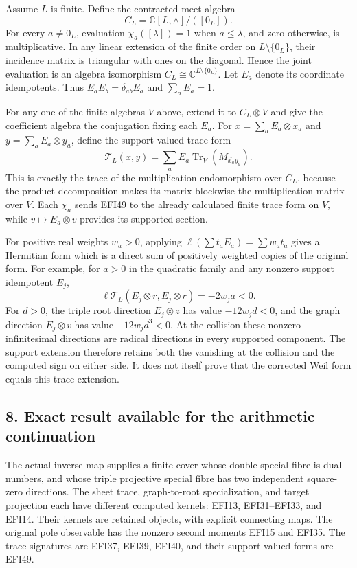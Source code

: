 \documentclass[
  10pt,
  a4paper,
]{article}
\begin{document}
Assume \(L\) is finite. Define the contracted meet algebra \[
C_L=\mathbb C[L,\wedge]/([0_L]).
\tag{EFI48}
\] For every \(a\ne0_L\), evaluation \(\chi_a([\lambda])=1\) when
\(a\le\lambda\), and zero otherwise, is multiplicative. In any linear
extension of the finite order on \(L\setminus\{0_L\}\), their incidence
matrix is triangular with ones on the diagonal. Hence the joint
evaluation is an algebra isomorphism
\(C_L\cong\mathbb C^{L\setminus\{0_L\}}\). Let \(E_a\) denote its
coordinate idempotents. Thus \(E_aE_b=\delta_{ab}E_a\) and
\(\sum_aE_a=1\).

For any one of the finite algebras \(V\) above, extend it to
\(C_L\otimes V\) and give the coefficient algebra the conjugation fixing
each \(E_a\). For \(x=\sum_aE_a\otimes x_a\) and
\(y=\sum_aE_a\otimes y_a\), define the support-valued trace form \[
\mathcal T_L(x,y)=\sum_a E_a
\operatorname{Tr}_V(M_{\overline{x_a}y_a}).
\tag{EFI49}
\] This is exactly the trace of the multiplication endomorphism over
\(C_L\), because the product decomposition makes its matrix blockwise
the multiplication matrix over \(V\). Each \(\chi_a\) sends EFI49 to the
already calculated finite trace form on \(V\), while
\(v\mapsto E_a\otimes v\) provides its supported section.

For positive real weights \(w_a>0\), applying
\(\ell(\sum t_aE_a)=\sum w_at_a\) gives a Hermitian form which is a
direct sum of positively weighted copies of the original form. For
example, for \(a>0\) in the quadratic family and any nonzero support
idempotent \(E_j\), \[
\ell\mathcal T_L(E_j\otimes r,E_j\otimes r)=-2w_ja<0.
\tag{EFI50}
\] For \(d>0\), the triple root direction \(E_j\otimes z\) has value
\(-12w_jd<0\), and the graph direction \(E_j\otimes v\) has value
\(-12w_jd^3<0\). At the collision these nonzero infinitesimal directions
are radical directions in every supported component. The support
extension therefore retains both the vanishing at the collision and the
computed sign on either side. It does not itself prove that the
corrected Weil form equals this trace extension.

\subsection{8. Exact result available for the arithmetic
continuation}\label{exact-result-available-for-the-arithmetic-continuation}

The actual inverse map supplies a finite cover whose double special
fibre is dual numbers, and whose triple projective special fibre has two
independent square-zero directions. The sheet trace, graph-to-root
specialization, and target projection each have different computed
kernels: EFI13, EFI31--EFI33, and EFI14. Their kernels are retained
objects, with explicit connecting maps. The original pole observable has
the nonzero second moments EFI15 and EFI35. The trace signatures are
EFI37, EFI39, EFI40, and their support-valued forms are EFI49.
\end{document}
